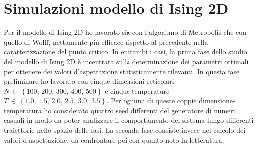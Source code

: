 \section{Simulazioni modello di Ising 2D}

Per il modello di Ising 2D ho lavorato sia con l'algoritmo di Metropolis che con quello di Wolff, nettamente più efficace rispetto al 
precedente nella caratterizzazione del punto critico. In entrambi i casi, la prima fase dello studio del modello di Ising 2D è incentrata 
sulla determinazione dei parametri ottimali per ottenere dei valori d'aspettazione statisticamente rilevanti.
In questa fase preliminare ho lavorato con cinque dimensioni reticolari $N\,\in\,\left\{100,\,200,\,300,\,400,\,500\right\}$ e 
cinque temperature $T\,\in\,\left\{1.0,\,1.5,\,2.0,\,2.5,\,3.0,\,3.5\right\}$. Per ognuna di queste coppie dimensione-temperatura 
ho considerato quattro seed differenti del generatore di numeri casuali in modo da poter analizzare il comportamento del sistema 
lungo differenti traiettorie nello spazio delle fasi. La seconda fase consiste invece nel calcolo dei valori d'aspettazione, da confrontare 
poi con quanto noto in letteratura.

